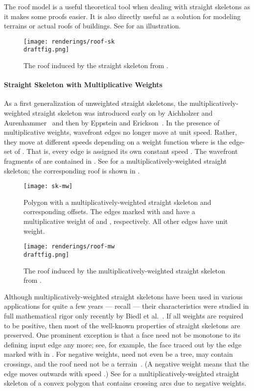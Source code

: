 \documentclass[preprint]{elsarticle}
\newcommand{\draftfig}{.small}
\begin{document}
The roof model is a useful theoretical tool when dealing with straight
skeletons as it makes some proofs easier.  It is also directly useful
as a solution for modeling terrains or actual roofs of buildings.
See  for an illustration.

\begin{figure}[ht!]
  \centering
  \texttt{[image: renderings/roof-sk\\draftfig.png]}
    \caption{The roof induced by the straight skeleton from .
     }
  \label{fig:sk-roof}
\end{figure}

\paragraph{Straight Skeleton with Multiplicative Weights}

As a first generalization of unweighted straight skeletons, the
multiplicatively-weighted straight skeleton was introduced early on by
Aichholzer and Aurenhammer~\cite{AiAu98} and then by Eppstein and
Erickson~\cite{EpEr99}.
In the presence of multiplicative weights, wavefront edges no longer move at
unit speed. Rather, they move at different speeds depending on a weight
function  where  is the edge-set of .
That is, every edge  is assigned its own constant speed .
The wavefront fragments of  are contained in
. See 
for a multiplicatively-weighted straight skeleton; the corresponding roof is
shown in .

\begin{figure}[htb!]
  \centering
  \texttt{[image: sk-mw]}
    \caption{Polygon with a multiplicatively-weighted straight skeleton
       and corresponding offsets.
The edges marked with  and  have a multiplicative
       weight of  and , respectively.  All other
       edges have unit weight.
     }
  \label{fig:sk-mw}
\end{figure}

\begin{figure}[htb!]
  \centering
  \texttt{[image: renderings/roof-mw\\draftfig.png]}
    \caption{The roof induced by the multiplicatively-weighted straight skeleton from
       .
     }
  \label{fig:sk-mw-roof}
\end{figure}

Although multiplicatively-weighted straight skeletons have been used
in various applications for quite a few years --- recall
 --- their characteristics were studied in full
mathematical rigor only recently by Biedl et al.~\cite{Bie&15a}.  If
all weights are required to be positive, then most of the well-known
properties of straight skeletons are preserved.  One prominent
exception is that a face need not be monotone to its defining input
edge any more; see, for example, the face traced out by the edge
marked with  in .  For negative weights, 
need not even be a tree, may contain crossings, and the roof need not
be a terrain~\cite{Bie&15a}. (A negative weight  means that
the edge  moves outwards with speed .)  See
 for a multiplicatively-weighted straight
skeleton of a convex polygon that contains crossing arcs due to
negative weights.
\end{document}
